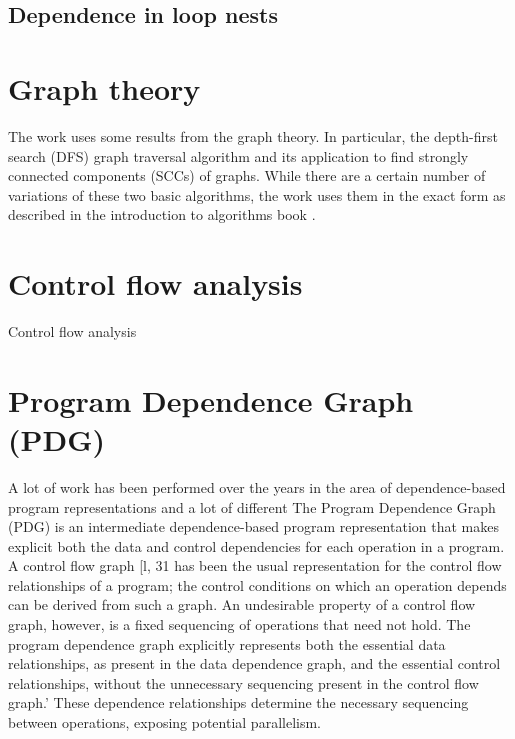 \subsection{Dependence in loop nests}   
\label{background-dependence-loop-nests}


\section{Graph theory} \label{background-graph-theory}
\qquad The work uses some results from the graph theory. In particular, the depth-first search (DFS) graph traversal algorithm and its application to find strongly connected components (SCCs) of graphs. While there are a certain number of variations of these two basic algorithms, the work uses them in the exact form as described in the introduction to algorithms book \cite{introduction-to-algorithms-book}.

\section{Control flow analysis} \label{background-control-flow-analysis}
\qquad Control flow analysis \cite{advanced-compiler-design-book}

\section{Program Dependence Graph (PDG)} \label{background-program-dependence-graph}
\qquad A lot of work has been performed over the years in the area of dependence-based program representations and a lot of different  \newline 
\null\qquad The Program Dependence Graph (PDG) is an intermediate dependence-based program representation that makes explicit both the data and control dependencies for each operation in a program. A control flow graph [l, 31 has
been the usual representation for the control flow relationships of a program; the control conditions on which an operation depends can be derived from such a
graph. An undesirable property of a control flow graph, however, is a fixed
sequencing of operations that need not hold. The program dependence graph
explicitly represents both the essential data relationships, as present in the data dependence graph, and the essential control relationships, without the unnecessary sequencing present in the control flow graph.’ These dependence relationships determine the necessary sequencing between operations, exposing potential parallelism. 

